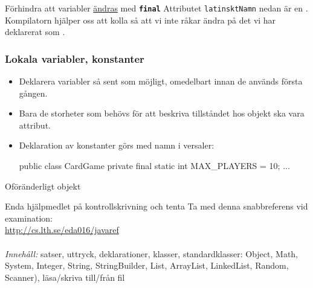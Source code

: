 \documentclass{lecturenotes}
\begin{document}
\begin{Slide}{Förhindra att variabler \href{https://docs.oracle.com/javase/tutorial/essential/concurrency/immutable.html}{ändras} med \texttt{\textbf{final}}}
Attributet \texttt{latinsktNamn} nedan är en .\\ Kompilatorn hjälper oss att kolla så att vi inte råkar ändra på det vi har deklarerat som .

\end{Slide}

\begin{frame}[fragile=singleslide]
\frametitle{Lokala variabler, konstanter}
\begin{itemize}
\item Deklarera variabler så sent som möjligt, omedelbart innan de används första gången.
\item Bara de storheter som behövs för att beskriva tillståndet hos objekt ska vara attribut.
\item Deklaration av konstanter görs  med namn i versaler:
\begin{Code}
public class CardGame {
	private final static int MAX_PLAYERS = 10;
	...
}
\end{Code}
\end{itemize}
\end{frame} 

\begin{Slide}{Oföränderligt objekt}

\end{Slide}

\begin{Slide}{Enda hjälpmedlet på kontrollskrivning och tenta}
Ta med denna snabbreferens  vid examination: \\ 
\url{http://cs.lth.se/eda016/javaref} \\ \vspace{1em}
 \\ \vspace{1em}
\textit{Innehåll:} satser, uttryck, deklarationer, klasser, standardklasser: Object, Math, System, Integer, String, StringBuilder, List, ArrayList, LinkedList, Random, Scanner), läsa/skriva till/från fil  
\end{Slide}
\end{document}
